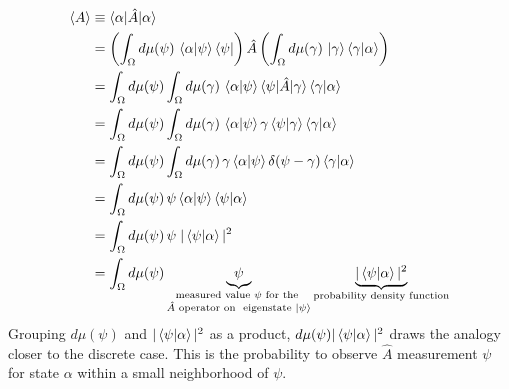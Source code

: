 \documentclass[12pt]{article}
\numberwithin{equation}{section}
\begin{document}
\begin{align*}
    \braket{A} &\equiv \braket{\alpha | \hat{A} | \alpha}\\
    &= \left( \int_{\Omega} d\mu(\psi) \, \braket{\alpha | \psi }\bra{\psi} \right) \hat{A} \left( \int_{\Omega} d\mu(\gamma) \, \ket{\gamma}\braket{\gamma | \alpha} \right) \\
    &= \int_{\Omega} d\mu(\psi) \int_{\Omega} d\mu(\gamma) \, \braket{\alpha | \psi } \braket{\psi | \hat{A} | \gamma} \braket{\gamma | \alpha} \\
    &= \int_{\Omega} d\mu(\psi) \int_{\Omega} d\mu(\gamma) \, \braket{\alpha | \psi } \gamma \braket{\psi | \gamma} \braket{\gamma | \alpha} \\
    &= \int_{\Omega} d\mu(\psi) \int_{\Omega} d\mu(\gamma) \, \gamma \braket{\alpha | \psi } \delta(\psi - \gamma) \braket{\gamma | \alpha} \\
    &= \int_{\Omega} d\mu(\psi) \, \psi \braket{\alpha | \psi } \braket{\psi | \alpha} \\
    &= \int_{\Omega} d\mu(\psi) \, \psi \hspace{0.1cm} |\braket{\psi | \alpha}|^2 \\
    &= \int_{\Omega} d\mu(\psi) \underbrace{\psi}_{\substack{\text{measured value } \psi \text{ for the } \\ \hat{A} \text{ operator on } \text{ eigenstate } \ket{\psi}}} \underbrace{|\braket{\psi | \alpha}|^2}_{\substack{\text{probability density function}}}
\end{align*}
Grouping $d\mu(\psi)$ and $|\braket{\psi | \alpha}|^2$ as a product, $d\mu(\psi) |\braket{\psi | \alpha}|^2$ draws the analogy closer to the discrete case. This is the probability to observe  
$\hat{A}$ measurement $\psi$ for state $\alpha$ within a small neighborhood of $\psi$.
\end{document}
